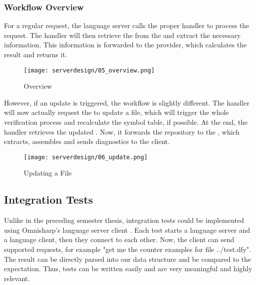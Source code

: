 \subsubsection{Workflow Overview}
For a regular request, the language server calls the proper handler to process the request.
The handler will then retrieve the  from the  and extract the necessary information.
This information is forwarded to the provider, which calculates the result and returns it.

\begin{figure}[H]
    \centering
    \texttt{[image: serverdesign/05\_overview.png]}
    \caption{Overview}
    \label{fig:server_overview}
\end{figure}


However, if an update is triggered, the workflow is slightly different.
The handler will now actually request the  to update a file, which will trigger the whole verification process and recalculate the symbol table, if possible.
At the end, the handler retrieves the updated .
Now, it forwards the repository to the , which extracts, assembles and sends diagnostics to the client.

\begin{figure}[H]
    \centering
    \texttt{[image: serverdesign/06\_update.png]}
    \caption{Updating a File}
    \label{fig:server_update}
\end{figure}


\subsection{Integration Tests}
\label{chapter:designTests}
Unlike in the preceding semester thesis, integration tests could be implemented using Omnisharp's language server client \cite{omnisharpClient}.
Each test starts a language server and a language client, then they connect to each other.
Now, the client can send supported requests, for example "get me the counter examples for file ../test.dfy".
The result can be directly parsed into our  data structure and be compared to the expectation.
Thus, tests can be written easily and are very meaningful and highly relevant.

